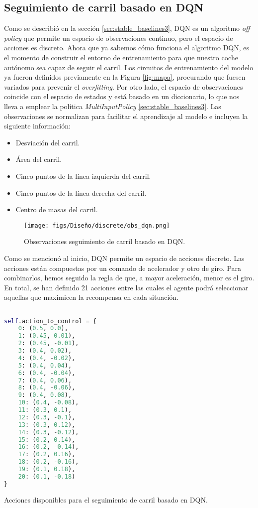 \subsection{Seguimiento de carril basado en \ac{DQN}}

Como se describió en la sección \ref{sec:stable_baselines3}, \ac{DQN} es un algoritmo \textit{off policy} que permite un espacio de observaciones continuo, pero el espacio de acciones es discreto. Ahora que ya sabemos cómo funciona el algoritmo \ac{DQN}, es el momento de construir el entorno de entrenamiento para que nuestro coche autónomo sea capaz de seguir el carril. Los circuitos de entrenamiento del modelo ya fueron definidos previamente en la Figura \ref{fig:mapa}, procurando que fuesen variados para prevenir el \textit{overfitting}. Por otro lado, el espacio de observaciones coincide con el espacio de estados y está basado en un diccionario, lo que nos lleva a emplear la política \textit{MultiInputPolicy} \ref{sec:stable_baselines3}. Las observaciones se normalizan para facilitar el aprendizaje al modelo e incluyen la siguiente información:
\begin{itemize}
		\item Desviación del carril.
		\item Área del carril.
		\item Cinco puntos de la línea izquierda del carril.
		\item Cinco puntos de la línea derecha del carril.
		\item Centro de masas del carril.
\end{itemize}

\begin{figure}[ht]
  \centering
  \texttt{[image: figs/Diseño/discrete/obs\_dqn.png]}
  \caption{Observaciones seguimiento de carril basado en \ac{DQN}.}
  \label{fig:dqn_obs}
\end{figure}

Como se mencionó al inicio, \ac{DQN} permite un espacio de acciones discreto. Las acciones están compuestas por un comando de acelerador y otro de giro. Para combinarlos, hemos seguido la regla de que, a mayor aceleración, menor es el giro. En total, se han definido 21 acciones entre las cuales el agente podrá seleccionar aquellas que maximicen la recompensa en cada situación.
\begin{code}[h]
\begin{lstlisting}[language=Python]

self.action_to_control = {
    0: (0.5, 0.0),
    1: (0.45, 0.01), 
    2: (0.45, -0.01),
    3: (0.4, 0.02),
    4: (0.4, -0.02),
    5: (0.4, 0.04),
    6: (0.4, -0.04),
    7: (0.4, 0.06),
    8: (0.4, -0.06),
    9: (0.4, 0.08),
    10: (0.4, -0.08),
    11: (0.3, 0.1),
    12: (0.3, -0.1),
    13: (0.3, 0.12),
    14: (0.3, -0.12),
    15: (0.2, 0.14),
    16: (0.2, -0.14),
    17: (0.2, 0.16),
    18: (0.2, -0.16),
    19: (0.1, 0.18),
    20: (0.1, -0.18)
}
\end{lstlisting}
\caption[Acciones disponibles para el seguimiento de carril basado en \ac{DQN}]{Acciones disponibles para el seguimiento de carril basado en \ac{DQN}.}
\label{cod:acc_dqn}
\end{code}

